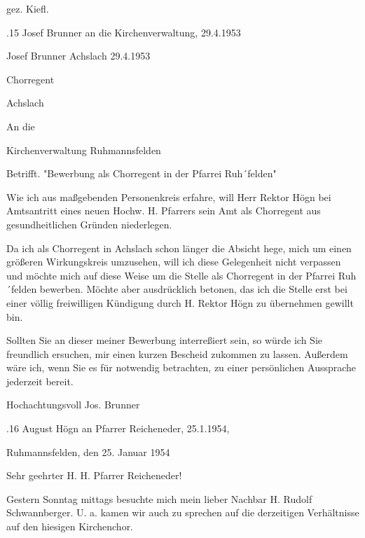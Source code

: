 \documentclass{book}
\begin{document}
gez. Kiefl.

.15 Josef Brunner an die Kirchenverwaltung, 29.4.1953

Josef Brunner                   Achslach 29.4.1953

Chorregent

Achslach



An die

Kirchenverwaltung Ruhmannsfelden



Betrifft. "Bewerbung als Chorregent in der Pfarrei Ruh´felden"



Wie ich aus maßgebenden Personenkreis erfahre, will Herr Rektor Högn bei
Amtsantritt eines neuen Hochw. H. Pfarrers sein Amt als Chorregent aus
gesundheitlichen Gründen niederlegen.

Da ich als Chorregent in Achslach schon länger die Absicht hege, mich um einen
größeren Wirkungskreis umzusehen, will ich diese Gelegenheit nicht verpassen und
möchte mich auf diese Weise um die Stelle als Chorregent in der Pfarrei
Ruh´felden bewerben. Möchte aber ausdrücklich betonen, das ich die Stelle erst
bei einer völlig freiwilligen Kündigung durch H. Rektor Högn zu übernehmen
gewillt bin.

Sollten Sie an dieser meiner Bewerbung interreßiert sein, so würde ich Sie
freundlich ersuchen, mir einen kurzen Bescheid zukommen zu lassen. Außerdem wäre
ich, wenn Sie es für notwendig betrachten, zu einer persönlichen Aussprache
jederzeit bereit.



Hochachtungsvoll Jos. Brunner

.16 August Högn an Pfarrer Reicheneder, 25.1.1954,

Ruhmannsfelden, den 25. Januar 1954



Sehr geehrter H. H. Pfarrer Reicheneder!



Gestern Sonntag mittags besuchte mich mein lieber Nachbar H. Rudolf
Schwannberger. U. a. kamen wir auch zu sprechen auf die derzeitigen Verhältnisse
auf den hiesigen Kirchenchor.
\end{document}
